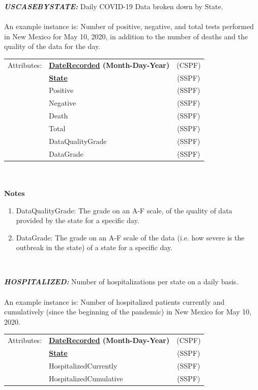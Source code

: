 \documentclass[11pt]{article}
\begin{document}
\begin{description}
\item{\em\bf USCASEBYSTATE:} Daily COVID-19 Data broken down by State. \\ \\

An example instance is: Number of positive, negative, and total tests performed in New Mexico for May 10, 2020, in addition to the number of deaths and the quality of the data for the day. \\
 
\begin{tabular}{llc}
 Attributes: & {\bf \underline{DateRecorded} (Month-Day-Year)} &  (CSPF) \\
	    & {\bf \underline{State}} &  (SSPF) \\
	    & Positive & (SSPF) \\
	    & Negative & (SSPF) \\
	    & Death & (SSPF) \\
	    & Total & (SSPF) \\
	    & DataQualityGrade & (SSPF) \\
	    & DataGrade & (SSPF) \\
\end{tabular} \\
\\
\textbf{Notes}
\begin{enumerate}
    \item DataQualityGrade: The grade on an A-F scale, of the quality of data provided by the state for a specific day.
    \item DataGrade: The grade on an A-F scale of the data (i.e. how severe is the outbreak in the state) of a state for a specific day.
\end{enumerate} \\

\item{\em\bf HOSPITALIZED:} Number of hospitalizations per state on a daily basis. \\ \\

An example instance is: Number of hospitalized patients currently and cumulatively (since the beginning of the pandemic) in New Mexico for May 10, 2020. \\
 
\begin{tabular}{llc}
 Attributes: & {\bf \underline{DateRecorded} (Month-Day-Year)} &  (CSPF) \\
	    & {\bf \underline{State}} &  (SSPF) \\
	    & HospitalizedCurrently & (SSPF) \\
	    & HospitalizedCumulative & (SSPF) \\
\end{tabular} \\


\end{description}
\end{document}
